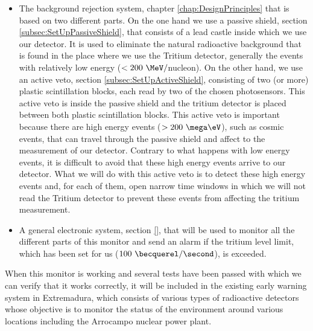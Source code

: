 \begin{itemize}
\item{} The background rejection system, chapter \ref{chap:DesignPrinciples} that is based on two different parts. On the one hand we use a passive shield, section \ref{subsec:SetUpPassiveShield}, that consists of a lead castle inside which we use our detector. It is used to eliminate the natural radioactive background that is found in the place where we use the Tritium detector, generally the events with relatively low energy ($<200~\MeV/$nucleon). On the other hand, we use an active veto, section \ref{subsec:SetUpActiveShield}, consisting of two (or more) plastic scintillation blocks, each read by two of the chosen photosensors. This active veto is inside the passive shield and the tritium detector is placed between both plastic scintillation blocks. This active veto is important because there are high energy events ($>200~\mega\eV$), such as cosmic events, that can travel through the passive shield and affect to the measurement of our detector. Contrary to what happens with low energy events, it is difficult to avoid that these high energy events arrive to our detector. What we will do with this active veto is to detect these high energy events and, for each of them, open narrow time windows in which we will not read the Tritium detector to prevent these events from affecting the tritium measurement.

\item{} A general electronic system, section \ref{}, that will be used to monitor all the different parts of this monitor and send an alarm if the tritium level limit, which has been set for us ($100~\becquerel/\second$), is exceeded.

\end{itemize}

When this monitor is working and several tests have been passed with which we can verify that it works correctly, it will be included in the existing early warning system in Extremadura, which consists of various types of radioactive detectors whose objective is to monitor the status of the environment around various locations including the Arrocampo nuclear power plant.